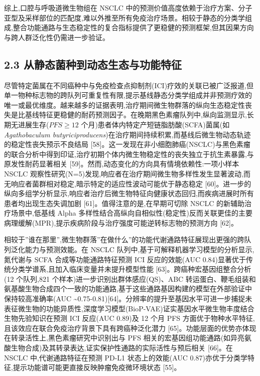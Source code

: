 综上,口腔与呼吸道微生物组在 NSCLC 中的预测价值高度依赖于治疗方案、分子亚型及采样部位的匹配度,难以外推至所有免疫治疗场景。相较于静态的分类学组成,整合功能通路与生态稳定性的复合指标提供了更稳健的预测框架,但其因果方向与跨人群泛化性仍需进一步验证。

\subsection{2.3 从静态菌种到动态生态与功能特征}\label{ux4eceux9759ux6001ux83ccux79cdux5230ux52a8ux6001ux751fux6001ux4e0eux529fux80fdux7279ux5f81}

尽管特定菌属在不同癌种中与免疫检查点抑制剂(ICI)疗效的关联已被广泛报道,但单一物种标志物的跨队列可重复性有限,提示基线静态分类学组成并非预测疗效的唯一或最优维度。越来越多的证据表明,治疗期间微生物群落的纵向生态稳定性丧失是比基线特征更稳健的耐药预测因子。在晚期黑色素瘤队列中,纵向监测显示,长期无进展生存(\(PFS \geq 12\) 个月)患者体内特定产短链脂肪酸(SCFA)菌属(如 \emph{Agathobaculum butyriciproducens})在治疗期间持续积累,而基线后微生物动态轨迹的稳定性丧失预示不良结局 {[}58{]}。这一发现在非小细胞肺癌(NSCLC)与黑色素瘤的联合分析中得到印证,治疗初期个体内微生物稳定性的丧失独立于抗生素暴露,与原发性耐药显著相关 {[}59{]}。然而,动态变化的方向具有情境依赖性:一项小样本 NSCLC 观察性研究(N=5)发现,响应者在治疗期间微生物多样性发生显著波动,而无响应者菌群相对稳定,暗示特定的适应性波动可能优于静态稳定 {[}60{]}。进一步的纵向多组学分析显示,响应者治疗后微生物特征向健康状态回归,而疾病进展时所有患者均出现生态失调加剧 {[}61{]}。值得注意的是,在早期可切除 NSCLC 的新辅助治疗场景中,低基线 Alpha 多样性结合高纵向自相似性(稳定性)反而关联更佳的主要病理缓解(MPR),提示疾病阶段与治疗强度可能逆转标志物的预测方向 {[}62{]}。

相较于''谁在那里'',微生物群落''在做什么''的功能代谢通路特征展现出更强的跨队列泛化能力与预测效能。在 NSCLC 队列中,基于可解释机器学习模型的分析显示,氮代谢与 SCFA 合成等功能通路特征预测 ICI 反应的效能(AUC 0.84)显著优于传统分类学谱系,且加入临床变量并未提升模型性能 {[}63{]}。跨癌种宏基因组整合分析(12 个队列,821 个样本)进一步识别出群体感应(QS)、ABC 转运蛋白、鞭毛组装和氨基酸生物合成四个一致的功能通路,基于这些通路基因构建的模型在外部验证中保持较高准确率(AUC \textasciitilde0.75-0.81){[}64{]}。分辨率的提升至基因水平可进一步捕捉未表征微生物的功能异质性,深度学习模型(BioP-VAE)证实基因水平微生物丰度结合生物先验知识在预测 ICI 反应(AUC 0.89)及 12 个月 PFS 方面优于物种水平特征,且该效应在联合免疫治疗背景下具有跨癌种泛化潜力 {[}65{]}。功能层面的优势亦体现在转录活性上,黑色素瘤研究中识别出与 PFS 相关的宏基因组功能通路(如异亮氨酸生物合成)及其转录表达,证实保护性通路的实际活性与预后相关 {[}66{]}。在 NSCLC 中,代谢通路特征在预测 PD-L1 状态上的效能(AUC 0.87)亦优于分类学特征,提示功能谱可能更直接反映肿瘤免疫微环境状态 {[}55{]}。


